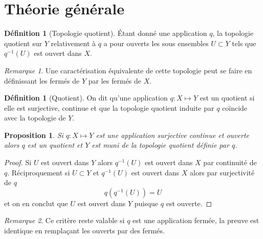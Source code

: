 \documentclass[12pt]{book}
\newtheorem{prop}[lemma]{Proposition}
\theoremstyle{definition}
\newtheorem{definition}[lemma]{Définition}
\theoremstyle{remark}
\newtheorem*{remark}{Remarque}
\begin{document}
	\section{Théorie générale}
	\begin{definition}[Topologie quotient]
		Étant donné une application $q$, la topologie quotient sur $Y$ relativement à $q$ a pour ouverts les sous ensembles $U \subset Y$ tels que $q^{-1}(U)$ est ouvert dans $X$.
	\end{definition}
	\begin{remark}
		Une caractérisation équivalente de cette topologie peut se faire en définissant les fermés de $Y$ par les fermés de $X$.
	\end{remark}
	\begin{definition}[Quotient]
		On dit qu'une application $q : X \longmapsto Y$ est un quotient si elle est surjective, continue et que la topologie quotient induite par $q$ coïncide avec la topologie de $Y$.	
	\end{definition}
	\begin{prop}
		Si $q : X \longmapsto Y$ est une application surjective continue et ouverte alors $q$ est un quotient et $Y$ est muni de la topologie quotient définie par $q$.
	\end{prop}
	\begin{proof}
		Si $U$ est ouvert dans $Y$ alors $q^{-1}(U)$ est ouvert dans $X$ par continuité de $q$. Réciproquement si  $ U \subset Y$ et $q^{-1}(U)$ est ouvert dans $X$ alors par surjectivité de $q$  \[
			q(q^{-1}(U)) = U
		\] et on en conclut que $U$ est ouvert dans $Y$ puisque $q$ est ouverte. 
	\end{proof}
	\begin{remark}
		Ce critère reste valable si $q$ est une application fermée, la preuve est identique en remplaçant les ouverts par des fermés.
	\end{remark}
\end{document}
